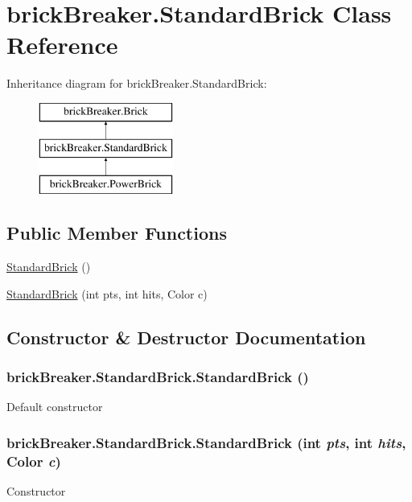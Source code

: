 \hypertarget{classbrick_breaker_1_1_standard_brick}{
\section{brickBreaker.StandardBrick Class Reference}
\label{classbrick_breaker_1_1_standard_brick}
}
Inheritance diagram for brickBreaker.StandardBrick:\begin{figure}[H]
\begin{center}
\leavevmode
\includegraphics[height=3cm]{classbrick_breaker_1_1_standard_brick}
\end{center}
\end{figure}
\subsection*{Public Member Functions}
\begin{DoxyCompactItemize}
\item 
\hyperlink{classbrick_breaker_1_1_standard_brick_a5521bf7ca0eeea9c887995f644654b46}{StandardBrick} ()
\item 
\hyperlink{classbrick_breaker_1_1_standard_brick_a035ddbcb9121dfa674c87518ae0d710e}{StandardBrick} (int pts, int hits, Color c)
\end{DoxyCompactItemize}


\subsection{Constructor \& Destructor Documentation}
\hypertarget{classbrick_breaker_1_1_standard_brick_a5521bf7ca0eeea9c887995f644654b46}{
\subsubsection[{StandardBrick}]{\setlength{\rightskip}{0pt plus 5cm}brickBreaker.StandardBrick.StandardBrick ()}}
\label{classbrick_breaker_1_1_standard_brick_a5521bf7ca0eeea9c887995f644654b46}
Default constructor \hypertarget{classbrick_breaker_1_1_standard_brick_a035ddbcb9121dfa674c87518ae0d710e}{
\subsubsection[{StandardBrick}]{\setlength{\rightskip}{0pt plus 5cm}brickBreaker.StandardBrick.StandardBrick (int {\em pts}, \/  int {\em hits}, \/  Color {\em c})}}
\label{classbrick_breaker_1_1_standard_brick_a035ddbcb9121dfa674c87518ae0d710e}
Constructor


